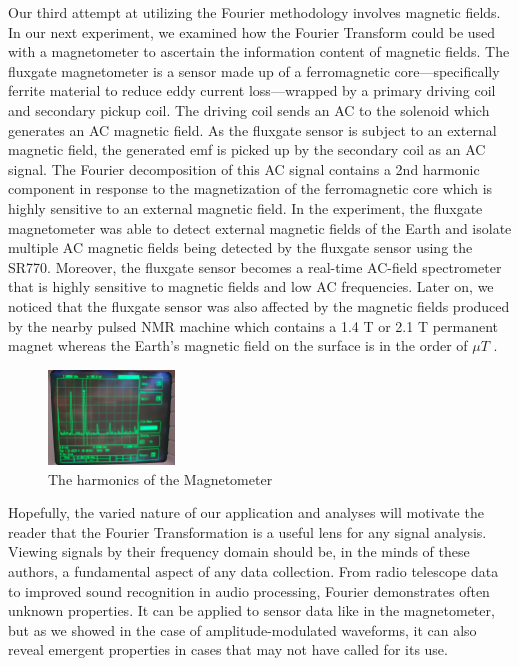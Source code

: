 \documentclass[prl,twocolumn,superscriptaddress,floatfix]{revtex4}
\begin{document}
Our third attempt at utilizing the Fourier methodology involves magnetic fields. 
In our next experiment, we examined how the Fourier Transform could be used with a magnetometer to ascertain the information content of magnetic fields.
The fluxgate magnetometer is a sensor made up of a ferromagnetic core---specifically ferrite material to reduce eddy current loss---wrapped by a primary driving coil and secondary pickup coil. The driving coil sends an AC to the solenoid which generates an AC magnetic field. As the fluxgate sensor is subject to an external magnetic field, the generated emf is picked up by the secondary coil as an AC signal. The Fourier decomposition of this AC signal contains a 2nd harmonic component in response to the magnetization of the ferromagnetic core which is highly sensitive to an external magnetic field.
In the experiment, the fluxgate magnetometer was able to detect external magnetic fields of the Earth and isolate multiple AC magnetic fields being detected by the fluxgate sensor using the SR770. Moreover, the fluxgate sensor becomes a real-time AC-field spectrometer that is highly sensitive to magnetic fields and low AC frequencies.
Later on, we noticed that the fluxgate sensor was also affected by the magnetic fields produced by the nearby pulsed NMR machine which contains a 1.4 T or 2.1 T permanent magnet whereas the Earth's magnetic field on the surface is in the order of $\mu T$ \cite{Cornell2000}.

\begin{figure}[H]
    \centering
    \includegraphics[width=0.3\textwidth]{Magnetometer Data.jpg}
    \caption{The harmonics of the Magnetometer}
    \label{fig:enter-label}
\end{figure}

Hopefully, the varied nature of our application and analyses will motivate the reader that the Fourier Transformation is a useful lens for any signal analysis.
Viewing signals by their frequency domain should be, in the minds of these authors, a fundamental aspect of any data collection.
From radio telescope data to improved sound recognition in audio processing, Fourier demonstrates often unknown properties.
It can be applied to sensor data like in the magnetometer, but as we showed in the case of amplitude-modulated waveforms, it can also reveal emergent properties in cases that may not have called for its use.

\nocite{Butz2015}

\end{document}
